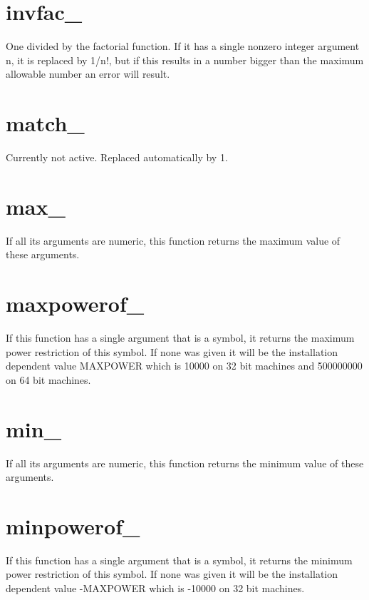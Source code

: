 \section{invfac\_}
\label{funinvfac}
\noindent One divided by the factorial function. If it has 
a single nonzero integer argument n, it is replaced by 1/n!, but if this 
results in a number bigger than the maximum allowable number an error will 
result.

\section{match\_}
\label{funmatch}
\noindent Currently not active. Replaced automatically by 1.

\section{max\_}
\label{funmax}
\noindent If all its arguments are numeric, this function returns 
the maximum value of these arguments.

\section{maxpowerof\_}
\label{funmaxpowerof}
\noindent If this function has a single argument that is a symbol, it 
returns the maximum power restriction of this symbol. If none was given it 
will be the installation dependent value MAXPOWER which is 10000 on 
32 bit machines and 500000000 on 64 bit 
machines.

\section{min\_}
\label{funmin}
\noindent If all its arguments are numeric, this function returns 
the minimum value of these arguments.

\section{minpowerof\_}
\label{funminpowerof}
\noindent If this function has a single argument that is a symbol, it 
returns the minimum power restriction of this symbol. If none was given it 
will be the installation dependent value -MAXPOWER which is -10000 on 32 bit 
machines.

